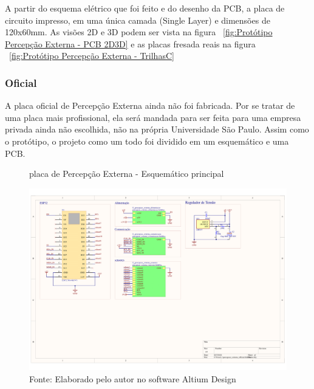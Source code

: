 \documentclass[../delivery_hospital_report.tex]{subfiles}
\begin{document}
  A partir do esquema elétrico que foi feito e do desenho da PCB, a placa de circuito impresso, em uma única camada (Single Layer) e dimensões de 120x60mm. As visões 2D e 3D podem ser vista na figura ~\ref{fig:Protótipo Percepção Externa - PCB 2D3D} e as placas fresada reais na figura ~\ref{fig:Protótipo Percepção Externa - TrilhasC}
  

\clearpage
\subsubsection{Oficial}

A placa oficial de Percepção Externa ainda não foi fabricada. Por se tratar de uma placa mais profissional, ela será mandada para ser feita para uma empresa privada ainda não escolhida, não na própria Universidade São Paulo. Assim como o protótipo, o projeto como um todo foi dividido em um esquemático e uma PCB.

\begin{figure}[!ht]
\centering
    \caption{placa de Percepção Externa - Esquemático principal }
    \centering %
    \includegraphics[width=17cm]{modulos/percepcao_externa_official-1.png}
    \caption*{Fonte: Elaborado pelo autor no software Altium Design\cite{altium21} }
    \label{Protótipo placa de ## - Esquemático principal}
\end{figure}
\end{document}
